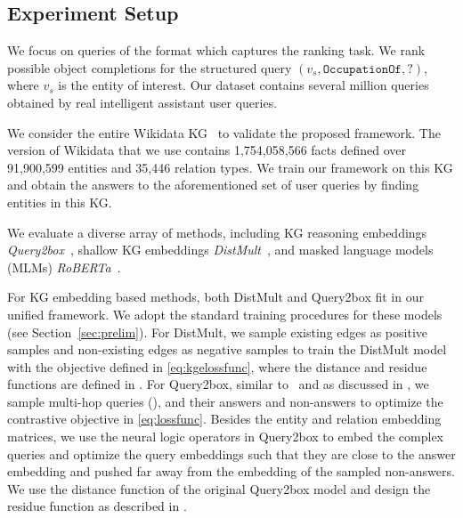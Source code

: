 \subsection{Experiment Setup}

We focus on queries of the format  which captures the ranking task. We rank possible object completions for the structured query $(v_s, \texttt{OccupationOf}, ?)$, where $v_s$ is the entity of interest. Our dataset contains several million queries obtained by real intelligent assistant user queries.

We consider the entire Wikidata KG~\cite{wikidata} to validate the proposed framework. The version of Wikidata that we use contains 1,754,058,566 facts defined over 91,900,599 entities and 35,446 relation types. We train our framework on this KG and obtain the answers to the aforementioned set of user queries by finding entities in this KG.

We evaluate a diverse array of methods, including KG reasoning embeddings \textit{Query2box}~\cite{ren2020query2box}, shallow KG embeddings \textit{DistMult}~\cite{distmult},  and masked language models (MLMs) \textit{RoBERTa}~\cite{liu2019roberta}. 

For KG embedding based methods, both DistMult and Query2box fit in our unified framework. We adopt the standard training procedures for these models (see Section~\ref{sec:prelim}). For DistMult, we sample existing edges as positive samples and non-existing edges as negative samples to train the DistMult model with the objective defined in \eqref{eq:kgelossfunc}, where the distance and residue functions are defined in . For Query2box, similar to~\cite{ren2020query2box} and as discussed in , we sample multi-hop queries (), and their answers and non-answers to optimize the contrastive objective in \eqref{eq:lossfunc}. Besides the entity and relation embedding matrices, we use the neural logic operators in Query2box to embed the complex queries and optimize the query embeddings such that they are close to the answer embedding and pushed far away from the embedding of the sampled non-answers. We use the distance function of the original Query2box model and design the residue function as described in .









